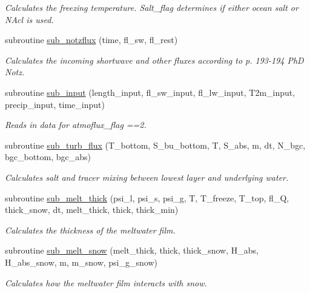 \begin{DoxyCompactItemize}
\begin{DoxyCompactList}\small\item\em Calculates the freezing temperature. Salt\_\-flag determines if either ocean salt or NAcl is used. \item\end{DoxyCompactList}\item 
subroutine \hyperlink{namespacemo__functions_a3c7420d9fae7442aeb1407179e971c35}{sub\_\-notzflux} (time, fl\_\-sw, fl\_\-rest)
\begin{DoxyCompactList}\small\item\em Calculates the incoming shortwave and other fluxes according to p. 193-\/194 PhD Notz. \item\end{DoxyCompactList}\item 
subroutine \hyperlink{namespacemo__functions_afbb9a7012e709e4b2b6f402a9831159e}{sub\_\-input} (length\_\-input, fl\_\-sw\_\-input, fl\_\-lw\_\-input, T2m\_\-input, precip\_\-input, time\_\-input)
\begin{DoxyCompactList}\small\item\em Reads in data for atmoflux\_\-flag ==2. \item\end{DoxyCompactList}\item 
subroutine \hyperlink{namespacemo__functions_aea674291e55cedde9a5ec71e45e92dc8}{sub\_\-turb\_\-flux} (T\_\-bottom, S\_\-bu\_\-bottom, T, S\_\-abs, m, dt, N\_\-bgc, bgc\_\-bottom, bgc\_\-abs)
\begin{DoxyCompactList}\small\item\em Calculates salt and tracer mixing between lowest layer and underlying water. \item\end{DoxyCompactList}\item 
subroutine \hyperlink{namespacemo__functions_a463f28035b07b28bba73b8a1100b848a}{sub\_\-melt\_\-thick} (psi\_\-l, psi\_\-s, psi\_\-g, T, T\_\-freeze, T\_\-top, fl\_\-Q, thick\_\-snow, dt, melt\_\-thick, thick, thick\_\-min)
\begin{DoxyCompactList}\small\item\em Calculates the thickness of the meltwater film. \item\end{DoxyCompactList}\item 
subroutine \hyperlink{namespacemo__functions_ad19818302426c2848ed285986cf1430d}{sub\_\-melt\_\-snow} (melt\_\-thick, thick, thick\_\-snow, H\_\-abs, H\_\-abs\_\-snow, m, m\_\-snow, psi\_\-g\_\-snow)
\begin{DoxyCompactList}\small\item\em Calculates how the meltwater film interacts with snow. \item\end{DoxyCompactList}\end{DoxyCompactItemize}


